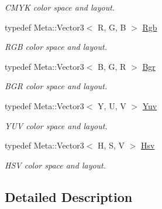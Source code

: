 \begin{DoxyCompactItemize}
\begin{DoxyCompactList}\small\item\em C\-M\-Y\-K color space and layout. \end{DoxyCompactList}\item 
\hypertarget{group___color_space_gaad92fea51e98e11252ac86f2c8665d13}{typedef Meta\-::\-Vector3$<$ R, G, B $>$ \hyperlink{group___color_space_gaad92fea51e98e11252ac86f2c8665d13}{Rgb}}\label{group___color_space_gaad92fea51e98e11252ac86f2c8665d13}

\begin{DoxyCompactList}\small\item\em R\-G\-B color space and layout. \end{DoxyCompactList}\item 
\hypertarget{group___color_space_ga9a1cd8af7d2fb33189763c2edb5f262b}{typedef Meta\-::\-Vector3$<$ B, G, R $>$ \hyperlink{group___color_space_ga9a1cd8af7d2fb33189763c2edb5f262b}{Bgr}}\label{group___color_space_ga9a1cd8af7d2fb33189763c2edb5f262b}

\begin{DoxyCompactList}\small\item\em B\-G\-R color space and layout. \end{DoxyCompactList}\item 
\hypertarget{group___color_space_ga8d04b5aa0ecd455aa29da0987b106ad0}{typedef Meta\-::\-Vector3$<$ Y, U, V $>$ \hyperlink{group___color_space_ga8d04b5aa0ecd455aa29da0987b106ad0}{Yuv}}\label{group___color_space_ga8d04b5aa0ecd455aa29da0987b106ad0}

\begin{DoxyCompactList}\small\item\em Y\-U\-V color space and layout. \end{DoxyCompactList}\item 
\hypertarget{group___color_space_gaef854af3bd9309a9d2cfec268e7ccb9b}{typedef Meta\-::\-Vector3$<$ H, S, V $>$ \hyperlink{group___color_space_gaef854af3bd9309a9d2cfec268e7ccb9b}{Hsv}}\label{group___color_space_gaef854af3bd9309a9d2cfec268e7ccb9b}

\begin{DoxyCompactList}\small\item\em H\-S\-V color space and layout. \end{DoxyCompactList}\end{DoxyCompactItemize}


\subsection{Detailed Description}
